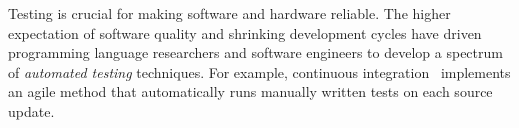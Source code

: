 \documentclass[fleqn,12pt]{article}
\begin{document}
%









Testing is crucial for making software and hardware reliable. The higher
expectation of software quality and shrinking development cycles have
driven programming language researchers and software engineers to
develop a spectrum of \emph{automated testing} techniques.
For example, continuous integration~\cite{duvall2007continuous}
implements an agile method that automatically runs manually written tests on each source update.
\end{document}
